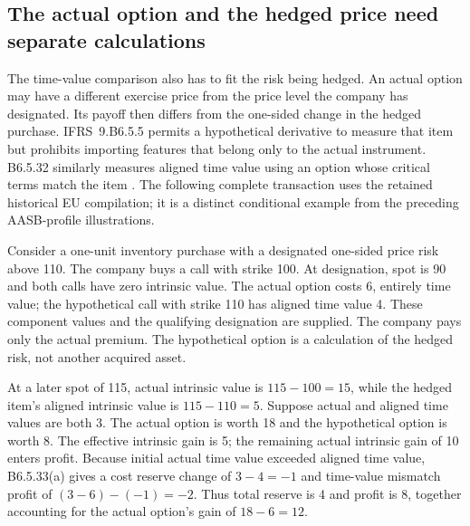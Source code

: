 \subsection{The actual option and the hedged price need separate calculations}
\label{actual-aligned-option-components}

The time-value comparison also has to fit the risk being hedged. An actual
option may have a different exercise price from the price level the company
has designated. Its payoff then differs from the one-sided change in the
hedged purchase. IFRS~9.B6.5.5 permits a hypothetical derivative to measure
that item but prohibits importing features that belong only to the actual
instrument. B6.5.32 similarly measures aligned time value using an option
whose critical terms match the item
\citep[IFRS~9.B6.5.5, B6.5.32--33]{eu20231803}. The following complete
transaction uses the retained historical EU compilation; it is a distinct
conditional example from the preceding AASB-profile illustrations.

Consider a one-unit inventory purchase with a designated one-sided price risk
above 110. The company buys a call with strike 100. At designation, spot is 90
and both calls have zero intrinsic value. The actual option costs 6, entirely
time value; the hypothetical call with strike 110 has aligned time value 4.
These component values and the qualifying designation are supplied. The
company pays only the actual premium. The hypothetical option is a calculation
of the hedged risk, not another acquired asset.

At a later spot of 115, actual intrinsic value is \(115-100=15\), while the
hedged item's aligned intrinsic value is \(115-110=5\). Suppose actual and
aligned time values are both 3. The actual option is worth 18 and the
hypothetical option is worth 8. The effective intrinsic gain is 5; the
remaining actual intrinsic gain of 10 enters profit. Because initial actual
time value exceeded aligned time value, B6.5.33(a) gives a cost reserve change
of \(3-4=-1\) and time-value mismatch profit of
\((3-6)-(-1)=-2\). Thus total reserve is 4 and profit is 8, together
accounting for the actual option's gain of \(18-6=12\).

